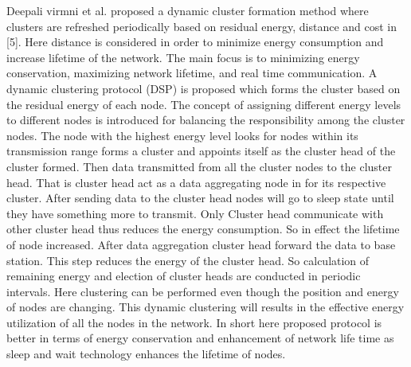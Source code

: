 \documentclass[MTech]{iitmdiss}
\begin{document}
Deepali virmni et al. proposed  a  dynamic cluster formation method where clusters are refreshed periodically based on residual energy, distance and cost in [5]. Here distance is   considered in order to minimize energy consumption and increase  lifetime of the network. The main focus is to minimizing energy conservation, maximizing network lifetime, and real time communication. A dynamic clustering protocol (DSP) is proposed  which forms the cluster based on the residual energy of each node. The concept of assigning different energy levels to different nodes is introduced  for  balancing the responsibility among the cluster nodes. The node with the highest energy level looks for nodes within its transmission range forms a cluster and  appoints itself as the cluster head  of the cluster formed. Then data transmitted from all the cluster nodes to the cluster head. That is cluster head act as a data aggregating node in for its respective cluster. After sending data to the cluster head nodes will go to sleep state until they have something more to transmit. Only Cluster head communicate with other cluster head thus reduces the energy consumption. So in effect the  lifetime of node  increased. After data aggregation cluster head forward the data to base station. This step reduces the energy of the cluster head. So calculation of remaining energy and election of cluster heads are conducted in periodic intervals. Here clustering can be performed even though the position and energy of nodes are changing. This dynamic clustering will results in the effective energy utilization of all the nodes in the network. In short here proposed protocol  is better in terms of energy conservation and enhancement of network life time as sleep and wait technology enhances the 
lifetime of nodes.
\end{document}
